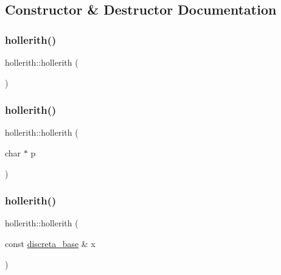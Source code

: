 \subsection{Constructor \& Destructor Documentation}
\mbox{\label{classhollerith_a13144dcd320e47e22e7969297188154e}} 
\subsubsection{\texorpdfstring{hollerith()}{hollerith()}\hspace{0.1cm}{\footnotesize\ttfamily [1/3]}}
{\footnotesize\ttfamily hollerith\+::hollerith (\begin{DoxyParamCaption}{ }\end{DoxyParamCaption})}

\mbox{\label{classhollerith_a749438d664a740f9ad7da188494d3077}} 
\subsubsection{\texorpdfstring{hollerith()}{hollerith()}\hspace{0.1cm}{\footnotesize\ttfamily [2/3]}}
{\footnotesize\ttfamily hollerith\+::hollerith (\begin{DoxyParamCaption}\item[{char $\ast$}]{p }\end{DoxyParamCaption})}

\mbox{\label{classhollerith_ab2b25c6d04670336506b94a38d83ae00}} 
\subsubsection{\texorpdfstring{hollerith()}{hollerith()}\hspace{0.1cm}{\footnotesize\ttfamily [3/3]}}
{\footnotesize\ttfamily hollerith\+::hollerith (\begin{DoxyParamCaption}\item[{const \mbox{\hyperlink{classdiscreta__base}{discreta\+\_\+base}} \&}]{x }\end{DoxyParamCaption})}

